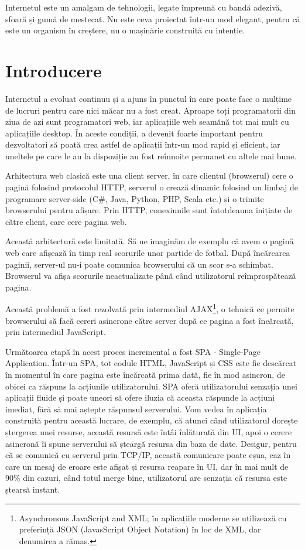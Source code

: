 \begin{savequote}[75mm]
Internetul este un amalgam de tehnologii, legate împreună cu bandă adezivă,
sfoară și gumă de mestecat. Nu este ceva proiectat într-un mod elegant,
pentru că este un organism în creștere, nu o mașinărie construită
cu intenție.
\end{savequote}

\chapter{Introducere}

Internetul a evoluat continuu și a ajuns în punctul în care poate face o mulțime
de lucruri pentru care nici măcar nu a fost creat. Aproape toți programatorii din
ziua de azi sunt programatori web, iar aplicațiile web seamănă tot mai mult cu 
aplicațiile desktop. În aceste condiții, a devenit foarte important pentru
dezvoltatori să poată crea astfel de aplicații într-un mod rapid și eficient, 
iar uneltele pe care le au la dispoziție au fost reînnoite permanet cu altele
mai bune.

Arhitectura web clasică este una client server, în care clientul (browserul)
cere o pagină folosind protocolul HTTP, serverul o crează dinamic folosind un 
limbaj de programare server-side (C\#, Java, Python, PHP, Scala etc.) și o trimite 
browserului pentru afișare. Prin HTTP, conexiunile sunt întotdeauna inițiate 
de către client, care cere pagina web.

Această arhitectură este limitată. Să ne imaginăm de exemplu că avem o pagină
web care afișează în timp real scorurile unor partide de fotbal. După încărcarea
paginii, server-ul nu-i poate comunica browserului că un scor s-a schimbat.
Browserul va afișa scorurile neactualizate până când utilizatorul reîmprospătează
pagina.

Această problemă a fost rezolvată prin intermediul
AJAX\footnote{Asynchronous JavaScript and XML; în aplicațiile moderne
se utilizează cu preferință JSON (JavasScript Object Notation) în loc de XML,
dar denumirea a rămas.},
o tehnică ce permite browserului să facă cereri asincrone către server după ce 
pagina a fost încărcată, prin intermediul JavaScript.

Următoarea etapă în acest proces incremental a fost SPA - Single-Page Application.
Într-un SPA, tot codule HTML, JavaScript și CSS este fie descărcat în momentul
în care pagina este încărcată prima dată, fie în mod asincron, de obicei ca
răspuns la acțiunile utilizatorului. SPA oferă utilizatorului senzația unei
aplicații fluide și poate uneori să ofere iluzia că aceasta răspunde la acțiuni
imediat, fără să mai aștepte răspunsul serverului. Vom vedea în aplicația
construită pentru această lucrare, de exemplu, că atunci când utilizatorul
dorește ștergerea unei resurse, această resursă este întâi înlăturată din UI,
apoi o cerere asincronă îi spune serverului să șteargă resursa din baza de date.
Desigur, pentru că se comunică cu serverul prin TCP/IP, această comunicare
poate eșua, caz în care un mesaj de eroare este afișat și resursa reapare în UI,
dar în mai mult de 90\% din cazuri, când totul merge bine, utilizatorul are
senzația că resursa este ștearsă instant.

